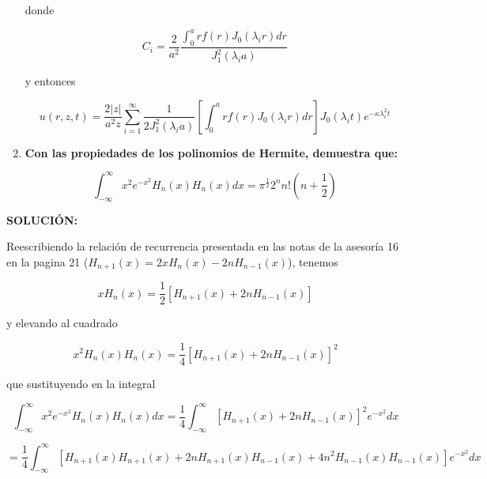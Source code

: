 \documentclass[12pt,a4paper]{article}
\begin{document}
\begin{enumerate}
   donde 
   
   \begin{equation*}
       C_i = \frac{2}{a^2} \frac{\int_{0}^{a} rf(r)J_0(\lambda_i r) dr}{J_1^2 (\lambda_i a)}
   \end{equation*}
   
   y entonces
   
   \begin{equation*}
       u(r,z,t)=\frac{2|z|}{a^2z} \sum_{i=1}^{\infty}\frac{1}{2J_1^{2}(\lambda_i a)}\left[\int_{0}^{a} rf(r)J_0(\lambda_i r) dr\right] J_0(\lambda_i t) e^{-\kappa \lambda_{i}^{2}t}
   \end{equation*}
   
    
    
    
    
    
    
    \item \textbf{Con las propiedades de los polinomios de Hermite, demuestra que:}
    
    \begin{equation*}
        \int_{-\infty}^{\infty} x^2 e^{-x^2} H_n(x)H_n(x)dx = \pi^{\frac{1}{2}} 2^{n} n! (n + \frac{1}{2})
    \end{equation*}
\end{enumerate}

 \textbf{SOLUCIÓN:}
 
 Reescribiendo la relación de recurrencia presentada en las notas de la asesoría 16 en la pagina 21    ($H_{n+1}(x)=2xH_n(x)-2nH_{n-1}(x)$), tenemos
 
 \begin{equation*}
     xH_n(x)= \frac{1}{2}[H_{n+1}(x) + 2nH_{n-1}(x)]
 \end{equation*}
 
 y elevando al cuadrado
 
 \begin{equation*}
   x^2 H_n(x)H_n(x)=\frac{1}{4} [H_{n+1}(x)+2nH_{n-1}(x)]^2
 \end{equation*}
 
 que sustituyendo en la integral
 
 \begin{equation*}
     \int_{-\infty}^{\infty} x^2 e^{-x^2} H_n(x)H_n(x)dx=\frac{1}{4}\int_{-\infty}^{\infty} [H_{n+1}(x)+2nH_{n-1}(x)]^2 e^{-x^2} dx
 \end{equation*}
 
 \begin{equation*}
     =\frac{1}{4}\int_{-\infty}^{\infty}[H_{n+1}(x)H_{n+1}(x) + 2nH_{n+1}(x)H_{n-1}(x)+4n^2H_{n-1}(x)H_{n-1}(x)]e^{-x^2}dx
 \end{equation*}
 
\end{document}
